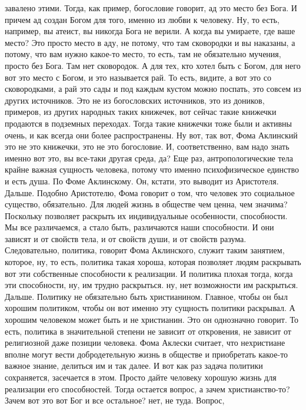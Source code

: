 завалено этими. Тогда, как пример, богословие говорит, ад это место без Бога. И
причем ад создан Богом для того, именно из любви к человеку. Ну, то есть,
например, вы атеист, вы никогда Бога не верили. А когда вы умираете, где ваше
место? Это просто место в аду, не потому, что там сковородки и вы наказаны, а
потому, что вам нужно какое-то место, то есть, там не обязательно мучения,
просто без Бога. Там нет сковородок. А для тех, кто хотел быть с Богом, для него
вот это место с Богом, и это называется рай. То есть, видите, а вот это со
сковородками, а рай это сады и под каждым кустом можно поспать, это совсем из
других источников. Это не из богословских источников, это из доников, примеров,
из других народных таких книжечек, вот сейчас такие книжечки продаются в
подземных переходах. Тогда такие книжечки тоже были и активны очень, и как
всегда они более распространены. Ну вот, так вот, Фома Аклинский это не это
книжечки, это не это богословие. И, соответственно, вам надо знать именно вот
это, вы все-таки другая среда, да? Еще раз, антропологические тела крайне важная
сущность человека, потому что именно психофизическое единство и есть душа. По
Фоме Аклинскому. Он, кстати, это выводит из Аристотеля. Дальше. Подобно
Аристотелю, Фома говорит о том, что человек это социальное существо,
обязательно. Для людей жизнь в обществе чем ценна, чем значима? Поскольку
позволяет раскрыть их индивидуальные особенности, способности. Мы все
различаемся, а стало быть, различаются наши способности. И они зависят и от
свойств тела, и от свойств души, и от свойств разума. Следовательно, политика,
говорит Фома Аклинского, служит таким занятием, которое, ну, то есть, политика
такая хороша, которая позволяет людям раскрывать вот эти собственные способности
к реализации. И политика плохая тогда, когда эти способности, ну, им трудно
раскрыться. ну, нет возможности им раскрыться. Дальше. Политику не обязательно
быть христианином. Главное, чтобы он был хорошим политиком, чтобы он вот именно
эту сущность политики раскрывал. А хорошим человеком может быть и не христианин.
Это он однозначно говорит. То есть, политика в значительной степени не зависит
от откровения, не зависит от религиозной даже позиции человека. Фома Аклески
считает, что нехристиане вполне могут вести добродетельную жизнь в обществе и
приобретать какое-то важное знание, делиться им и так далее. И вот как раз
задача политики сохраняется, засечается в этом. Просто дайте человеку хорошую
жизнь для реализации его способностей. Тогда остается вопрос, а зачем
христианство-то? Зачем вот это вот Бог и все остальное? нет, не туда. Вопрос,
